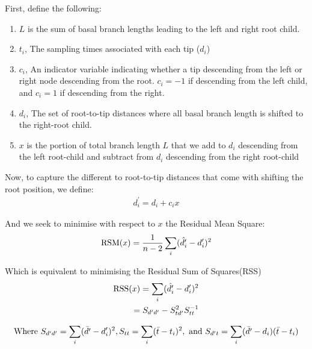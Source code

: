 \documentclass{article}
\begin{document}
First, define the following:
\begin{enumerate}

    \item $L$ is the sum of basal branch lengths leading to the left and right root child.
    \item {$t_i$}, The sampling times associated with each tip ($d_i$)
    \item {$c_i$}, An indicator variable indicating whether a tip descending from the left or right node descending from the root. $c_i = -1$ if descending from the left child, and $c_i = 1$ if descending from the right.
    \item {$d_i$}, \textnormal{The set of root-to-tip distances where all basal branch length is shifted to the right-root child.}
    \item $x$ is the portion of total branch length $L$ that we add to $d_i$ descending from the left root-child and subtract from $d_i$ descending from the right root-child
\end{enumerate}

Now, to capture the different to root-to-tip distances that come with shifting the root position, we define:
\begin{equation}
\begin{aligned}
    d^{\prime}_i = d_{i} + c_{i}x
\end{aligned}
\end{equation}

And we seek to minimise with respect to $x$ the Residual Mean Square:
\begin{equation}
    \textnormal{RSM}(x) = \frac{1}{n-2}\sum_{i}(\hat{d^{\prime}_i} - d^{\prime}_i)^2
\end{equation}

Which is equivalent to minimising the Residual Sum of Squares(RSS)
\begin{equation}
\begin{aligned}
    \textnormal{RSS}(x) = \sum_{i}(\hat{d^{\prime}_i} - d^{\prime}_i)^2 \\
    = S_{d^{\prime}d^{\prime}} - S_{td^{\prime}}^2S_{tt}^{-1}
\end{aligned}
\end{equation}

\begin{equation}
\begin{aligned}
        \textnormal{Where } S_{d^{\prime}d^{\prime}} = \sum_{i}(\bar{d^{\prime}} - d^{\prime}_i)^2,
        S_{tt}= \sum_{i}(\bar{t} - t_i)^2, \textnormal{ and } 
        S_{d^{\prime}t} = \sum_{i}(\bar{d^{\prime}}-d_i)(\bar{t}-t_i)
\end{aligned}
\end{equation}
\end{document}
